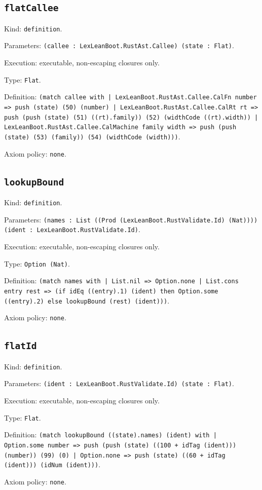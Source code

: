 \documentclass[11pt]{article}
\begin{document}
\subsection*{\texttt{flatCallee}}
\noindent Kind: \texttt{definition}.\par
\noindent Parameters: \texttt{(callee : LexLeanBoot.RustAst.Callee) (state : Flat)}.\par
\noindent Execution: executable, non-escaping closures only.\par
\noindent Type: \texttt{Flat}.\par
\noindent Definition: \texttt{(match callee with | LexLeanBoot.RustAst.Callee.CalFn number => push (state) (50) (number) | LexLeanBoot.RustAst.Callee.CalRt rt => push (push (state) (51) ((rt).family)) (52) (widthCode ((rt).width)) | LexLeanBoot.RustAst.Callee.CalMachine family width => push (push (state) (53) (family)) (54) (widthCode (width)))}.\par
\noindent Axiom policy: \texttt{none}.\par
\subsection*{\texttt{lookupBound}}
\noindent Kind: \texttt{definition}.\par
\noindent Parameters: \texttt{(names : List ((Prod (LexLeanBoot.RustValidate.Id) (Nat)))) (ident : LexLeanBoot.RustValidate.Id)}.\par
\noindent Execution: executable, non-escaping closures only.\par
\noindent Type: \texttt{Option (Nat)}.\par
\noindent Definition: \texttt{(match names with | List.nil => Option.none | List.cons entry rest => (if idEq ((entry).1) (ident) then Option.some ((entry).2) else lookupBound (rest) (ident)))}.\par
\noindent Axiom policy: \texttt{none}.\par
\subsection*{\texttt{flatId}}
\noindent Kind: \texttt{definition}.\par
\noindent Parameters: \texttt{(ident : LexLeanBoot.RustValidate.Id) (state : Flat)}.\par
\noindent Execution: executable, non-escaping closures only.\par
\noindent Type: \texttt{Flat}.\par
\noindent Definition: \texttt{(match lookupBound ((state).names) (ident) with | Option.some number => push (push (state) ((100 + idTag (ident))) (number)) (99) (0) | Option.none => push (state) ((60 + idTag (ident))) (idNum (ident)))}.\par
\noindent Axiom policy: \texttt{none}.\par
\end{document}
